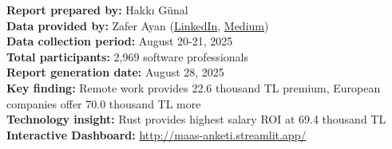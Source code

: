 \documentclass[12pt,a4paper]{article}
\begin{document}
\vspace{2cm}

\begin{center}
    \textbf{Report prepared by:} Hakkı Günal\\
    \textbf{Data provided by:} Zafer Ayan (\href{https://www.linkedin.com/posts/zaferayan_geleneksel-maa%C5%9F-anketi-buyrun-httpslnkdin-activity-7363866008664629248-7YcQ}{LinkedIn}, \href{https://zaferayan.medium.com/2025-ağustos-detaylı-maaş-anketi-98446d71920a}{Medium})\\
    \textbf{Data collection period:} August 20-21, 2025\\
    \textbf{Total participants:} 2,969 software professionals\\
    \textbf{Report generation date:} August 28, 2025\\
    \textbf{Key finding:} Remote work provides 22.6 thousand TL premium, European companies offer 70.0 thousand TL more\\
    \textbf{Technology insight:} Rust provides highest salary ROI at 69.4 thousand TL\\
    \textbf{Interactive Dashboard:} \href{http://maas-anketi.streamlit.app/}{http://maas-anketi.streamlit.app/}
    \end{center}
\end{document}
